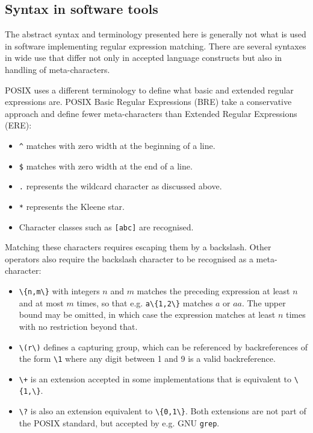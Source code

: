 \subsection{Syntax in software tools}

The abstract syntax and terminology presented here is generally not what is used
in software implementing regular expression matching. There are several syntaxes
in wide use that differ not only in accepted language constructs but also in
handling of meta-characters.

POSIX uses a different terminology to define what basic and extended regular
expressions are. POSIX Basic Regular Expressions (BRE) take a conservative
approach and define fewer meta-characters than Extended Regular Expressions
(ERE):

\begin{itemize}
   \item \verb'^' matches with zero width at the beginning of a line.
   \item \verb'$' matches with zero width at the end of a line.
   \item \verb'.' represents the wildcard character as discussed above.
   \item \verb'*' represents the Kleene star.
   \item Character classes such as \verb'[abc]' are recognised.
\end{itemize}

Matching these characters requires escaping them by a backslash. Other operators
also require the backslash character to be recognised as a meta-character:

\begin{itemize}
   \item \verb'\{n,m\}' with integers $n$ and $m$ matches the preceding
      expression at least $n$ and at most $m$ times, so that e.g.
      \verb'a\{1,2\}' matches $a$ or $aa$. The upper bound may be omitted, in
      which case the expression matches at least $n$ times with no restriction
      beyond that.
   \item \verb'\(r\)' defines a capturing group, which can be referenced by
      backreferences of the form \verb'\1' where any digit between 1 and 9 is a
      valid backreference.
   \item \verb'\+' is an extension accepted in some implementations that is
      equivalent to \verb'\{1,\}'.
   \item \verb'\?' is also an extension equivalent to \verb'\{0,1\}'. Both
      extensions are not part of the POSIX standard, but accepted by e.g. GNU
      \texttt{grep}.
\end{itemize}

